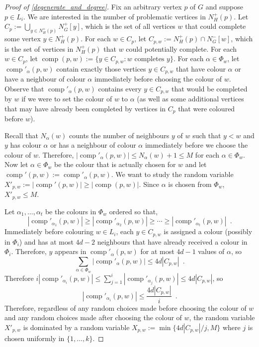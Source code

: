 \documentclass{patmorin}
\DeclareMathOperator{\comp}{comp}
\begin{document}
\begin{proof}[Proof of \cref{degenerate_and_degree}]
  Fix an arbitrary vertex $p$ of $G$ and suppose $p\in L_i$. We are interested in the number of problematic vertices in $N_H^+(p)$.  Let $C_p:=\bigcup_{y\in N^+_H(p)} N^+_G[y]$, which is the set of all vertices $w$ that could complete some vertex $y\in N^+_H(p)$. For each $w\in C_p$, let
  $C_{p,w}:=N_H^+(p)\cap N_G^-[w]$, which is the set of vertices in $N^+_{H}(p)$ that $w$ could potentially complete. For each $w\in C_p$, let $\comp(p,w):=\{y\in C_{p,w}:\text{$w$ completes $y$}\}$.  For each $\alpha\in\Phi_w$, let $\comp'_\alpha(p,w)$ contain exactly those vertices $y\in C_{p,w}$ that have colour $\alpha$ or have a neighbour of colour $\alpha$ immediately before choosing the colour of $w$.  Observe that $\comp'_\alpha(p,w)$ contains every $y\in C_{p,w}$ that would be completed by $w$ if we were to set the colour of $w$ to $\alpha$ (as well as some additional vertices that may have already been completed by vertices in $C_p$ that were coloured before $w$).

  Recall that $N_\alpha(w)$ counts the number of neighbours $y$ of $w$ such that $y < w$ and $y$ has colour $\alpha$ or has a neighbour of colour $\alpha$ immediately before we choose the colour of $w$.  Therefore,  $|\comp'_\alpha(p,w)|\le N_\alpha(w)+1\le M$ for each $\alpha\in\Phi_w$.  Now let $\alpha\in\Phi_w$ be the colour that is actually chosen for $w$ and let $\comp'(p,w):=\comp'_\alpha(p,w)$.  We want to study the random variable $X'_{p,w}:=|\comp'(p,w)|\ge |\comp(p,w)|$.  Since $\alpha$ is chosen from $\Phi_w$, $X'_{p,w} \le M$.

  Let $\alpha_1,\ldots,\alpha_t$ be the colours in $\Phi_w$ ordered so that,
  \[
    |\comp'_{\alpha_1}(p,w)|\ge|\comp'_{\alpha_2}(p,w)|\ge\cdots\ge |\comp'_{\alpha_t}(p,w)| \enspace .
  \]
  Immediately before colouring $w\in L_i$, each $y\in C_{p,w}$ is assigned a colour (possibly in $\Phi_i$) and has at most $4d-2$ neighbours that have already received a colour in $\Phi_i$.  Therefore, $y$ appears in
  $\comp'_{\alpha}(p,w)$ for at most $4d-1$ values of $\alpha$, so
  \[
    \sum_{\alpha\in\Phi_w} |\comp'_{\alpha}(p,w)| \le 4d| C_{p,w}| \enspace .
  \]
  Therefore $i|\comp'_{\alpha_i}(p,w)|\le\sum_{j=1}^i|\comp'_{\alpha_j}(p,w)|\le 4d|C_{p,w}|$, so
  \[
    |\comp'_{\alpha_i}(p,w)|\le \frac{4d|C_{p,w}|}{i} \enspace .
  \]
  Therefore, regardless of any random choices made before choosing the colour of $w$ and any random choices made after choosing the colour of $w$, the random variable $X'_{p,w}$ is dominated by a random variable $X_{p,w}:=\min\{4d|C_{p,w}|/j,M\}$ where $j$ is chosen uniformly in $\{1,\ldots,k\}$.


\end{proof}
\end{document}
